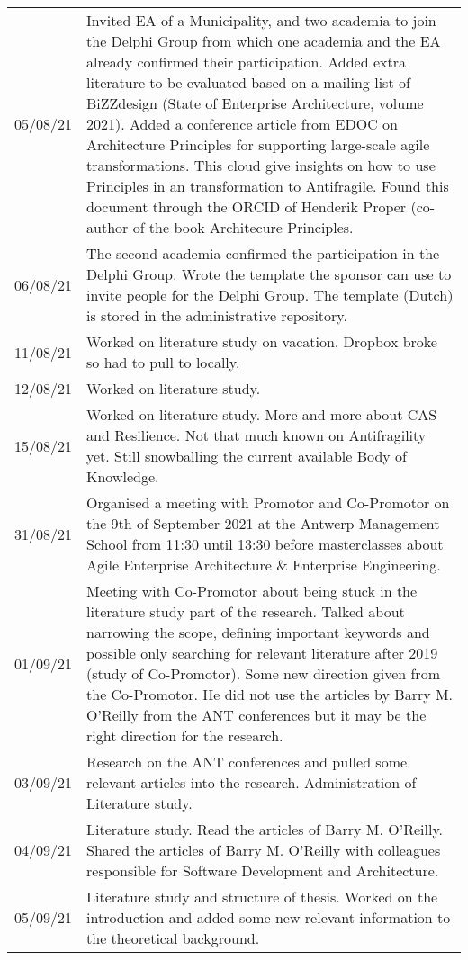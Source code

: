 \begin{longtable}{p{}p{}}
			05/08/21 & Invited EA of a Municipality, and two academia to join the Delphi Group from which one academia and the EA already confirmed their participation. Added extra literature to be evaluated based on a mailing list of BiZZdesign (State of Enterprise Architecture, volume 2021). Added a conference article from EDOC on Architecture Principles for supporting large-scale agile transformations. This cloud give insights on how to use Principles in an transformation to Antifragile. Found this document through the ORCID of Henderik Proper (co-author of the book Architecure Principles.\\%
			06/08/21 & The second academia confirmed the participation in the Delphi Group. Wrote the template the sponsor can use to invite people for the Delphi Group. The template (Dutch) is stored in the administrative repository.\\%
			11/08/21 & Worked on literature study on vacation. Dropbox broke so had to pull to locally.\\%
			12/08/21 & Worked on literature study.\\%
			15/08/21 & Worked on literature study. More and more about CAS and Resilience. Not that much known on Antifragility yet. Still snowballing the current available Body of Knowledge.\\%
			31/08/21 & Organised a meeting with Promotor and Co-Promotor on the 9th of September 2021 at the Antwerp Management School from 11:30 until 13:30 before masterclasses about Agile Enterprise Architecture \& Enterprise Engineering.\\%
			01/09/21 & Meeting with Co-Promotor about being stuck in the literature study part of the research. Talked about narrowing the scope, defining important keywords and possible only searching for relevant literature after 2019 (study of Co-Promotor). Some new direction given from the Co-Promotor. He did not use the articles by Barry M. O'Reilly from the ANT conferences but it may be the right direction for the research.\\%
			03/09/21 & Research on the ANT conferences and pulled some relevant articles into the research. Administration of Literature study.\\%
			04/09/21 & Literature study. Read the articles of Barry M. O'Reilly. Shared the articles of Barry M. O'Reilly with colleagues responsible for Software Development and Architecture.\\%
			05/09/21 & Literature study and structure of thesis. Worked on the introduction and added some new relevant information to the theoretical background.\\%

\end{longtable}
